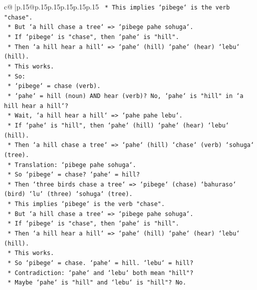 \documentclass{article}
\begin{document}
{\begin{supertabular}{c@{$\;$}|p{.15\linewidth}@{}p{.15\linewidth}p{.15\linewidth}p{.15\linewidth}p{.15\linewidth}p{.15\linewidth}}
{{{\texttt{            *   This implies `pibege` is the verb "chase".} \\
\texttt{            *   But `a hill chase a tree` => `pibege pahe sohuga`.} \\
\texttt{            *   If `pibege` is "chase", then `pahe` is "hill".} \\
\texttt{            *   Then `a hill hear a hill` => `pahe` (hill) `pahe` (hear) `lebu` (hill).} \\
\texttt{            *   This works.} \\
\texttt{            *   So:} \\
\texttt{                *   `pibege` = chase (verb).} \\
\texttt{                *   `pahe` = hill (noun) AND hear (verb)? No, `pahe` is "hill" in `a hill hear a hill`?} \\
\texttt{                *   Wait, `a hill hear a hill` => `pahe pahe lebu`.} \\
\texttt{                *   If `pahe` is "hill", then `pahe` (hill) `pahe` (hear) `lebu` (hill).} \\
\texttt{                *   Then `a hill chase a tree` => `pahe` (hill) `chase` (verb) `sohuga` (tree).} \\
\texttt{                *   Translation: `pibege pahe sohuga`.} \\
\texttt{                *   So `pibege` = chase? `pahe` = hill?} \\
\texttt{                *   Then `three birds chase a tree` => `pibege` (chase) `bahuraso` (bird) `lu` (three) `sohuga` (tree).} \\
\texttt{                *   This implies `pibege` is the verb "chase".} \\
\texttt{                *   But `a hill chase a tree` => `pibege pahe sohuga`.} \\
\texttt{                *   If `pibege` is "chase", then `pahe` is "hill".} \\
\texttt{                *   Then `a hill hear a hill` => `pahe` (hill) `pahe` (hear) `lebu` (hill).} \\
\texttt{                *   This works.} \\
\texttt{                *   So `pibege` = chase. `pahe` = hill. `lebu` = hill?} \\
\texttt{                *   Contradiction: `pahe` and `lebu` both mean "hill"?} \\
\texttt{                *   Maybe `pahe` is "hill" and `lebu` is "hill"? No.} \\
}}}
\end{supertabular}}
\end{document}
